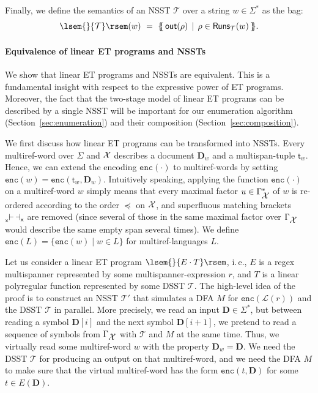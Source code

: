 \documentclass[
a4paper
]{article}
\theoremstyle{plain}
\theoremstyle{definition}
\theoremstyle{remark}
\newcommand{\varset}{\mbox{\ensuremath{\mathcal{X}}}}
\DeclareMathOperator{\openmark}{\vdash}
\DeclareMathOperator{\closemark}{\dashv}
\newcommand{\doc}{\ensuremath{\mathbf{D}}}
\newcommand{\open}[1]{\prescript{}{#1}{\openmark}}
\newcommand{\close}[1]{\closemark_{#1}}
\newcommand{\getDoc}[1]{\doc_{#1}}
\newcommand{\getSpanTuple}[1]{\textsf{t}_{#1}}
\newcommand{\varsx}{\ensuremath{\textsf{x}}}
\newcommand{\lang}[1]{\ensuremath{\mathcal{L}(#1)}}
\newcommand{\nrefw}[1]{\ensuremath{\mathtt{enc}(#1)}}
\newcommand{\nsst}{\mathcal{T}}
\newcommand{\sst}{\mathcal{T}}
\newcommand{\out}{\operatorname{out}}
\newcommand{\Runs}{\operatorname{Runs}}
\newcommand{\sem}[1]{{\lsem{}{#1}\rsem}}
\newcommand{\multiset}[1]{\{\!\!\{#1\}\!\!\}}
\renewcommand{\operatorname}[1]{\textsf{#1}}
\begin{document}
Finally, we define the semantics of an NSST $\nsst$ over a string $w \in \Sigma^*$ as the
bag:
\begin{equation*}
	\sem{\nsst}(w) \ = \ \multiset{\, \out(\rho) \, \mid \, \rho \in \Runs_{\nsst}(w)\, }.
\end{equation*}

\paragraph{Equivalence of linear ET programs and NSSTs} We show that 
linear ET programs and NSSTs are equivalent. This is a fundamental insight with respect to the expressive power of ET programs. Moreover, the fact that the two-stage model of linear ET programs can be described by a single NSST will be important for our enumeration algorithm 
(Section~\ref{sec:enumeration}) and their composition (Section~\ref{sec:composition}).

We first discuss how linear ET programs can be transformed into NSSTs. 
Every multiref-word over $\Sigma$ and $\varset$ describes a document $\getDoc{w}$ and a multispan-tuple $\getSpanTuple{w}$.
Hence,
we can extend the encoding $\nrefw{\cdot}$ to multiref-words by setting $\nrefw{w} = \nrefw{\getSpanTuple{w}, \getDoc{w}}$. Intuitively speaking, applying the function $\nrefw{\cdot}$ on a multiref-word $w$
simply means that every maximal factor $u \in \Gamma_{\varset}^*$ of $w$ is re-ordered according to the order $\preceq$ on $\varset$, and superfluous matching brackets $\open{\varsx} \close{\varsx}$ are removed (since several of those in the same maximal factor over $\Gamma_{\varset}$ would describe the same empty span several times). We define $\nrefw{L} = \{\nrefw{w} \mid w \in L\}$ for multiref-languages $L$.

Let us consider a linear ET program $\sem{E \cdot T}$, i.\,e., $E$ is a regex multispanner represented by some multispanner-expression
$r$, and $T$ is a linear polyregular function represented by some DSST $\sst$. The high-level idea of the proof is to construct an NSST $\sst'$ that simulates a DFA $M$ for $\nrefw{\lang{r}}$ and the DSST $\sst$ in parallel. More precisely, we read an input $\doc \in \Sigma^*$, but between reading a symbol $\doc[i]$ and the next symbol $\doc[i+1]$, we pretend to read a sequence of symbols from $\Gamma_{\varset}$ with $\sst$ and $M$ at the same time. Thus, we virtually read some multiref-word $w$ with the property $\getDoc{w} = \doc$. We need the DSST $\sst$ for producing an output on that multiref-word, and we need the DFA $M$ to make sure that the virtual multiref-word has the form $\nrefw{t, \doc}$ for some $t \in E(\doc)$.
\end{document}
